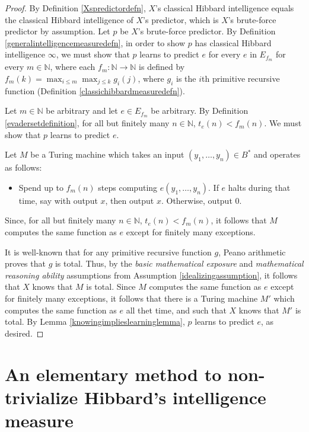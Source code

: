 \documentclass{article}
\begin{document}
\begin{proof}
    By Definition \ref{Xspredictordefn}, $X$'s classical Hibbard intelligence
    equals the classical Hibbard intelligence of $X$'s predictor, which is
    $X$'s brute-force predictor by assumption. Let $p$ be $X$'s brute-force
    predictor. By Definition \ref{generalintelligencemeasuredefn}, in order
    to show $p$ has classical Hibbard intelligence $\infty$, we must
    show that $p$ learns to predict $e$ for every $e$ in $E_{f_m}$ for
    every $m\in\mathbb N$,
    where each $f_m:\mathbb N\to\mathbb N$ is defined by
    $f_m(k)=\max_{i\leq m}\max_{j\leq k}g_i(j)$,
    where $g_i$ is the $i$th primitive recursive function
    (Definition \ref{classichibbardmeasuredefn}).

    Let $m\in\mathbb N$ be arbitrary and let $e\in E_{f_m}$ be arbitrary.
    By Definition \ref{evadersetdefinition},
    for all but finitely many $n\in\mathbb N$, $t_e(n)<f_m(n)$.
    We must show that $p$ learns to predict $e$.

    Let $M$ be a Turing machine which takes an input
    $(y_1,\ldots,y_n)\in B^*$ and
    operates as follows:
    \begin{itemize}
        \item
        Spend up to $f_m(n)$ steps computing $e(y_1,\ldots,y_n)$.
        If $e$ halts during that time, say with output $x$, then output $x$.
        Otherwise, output $0$.
    \end{itemize}
    Since, for all but finitely many $n\in\mathbb N$, $t_e(n)<f_m(n)$,
    it follows that $M$ computes the same function as $e$ except for finitely
    many exceptions.

    It is well-known that for any primitive recursive function $g$, Peano
    arithmetic proves that $g$ is total. Thus, by the \emph{basic mathematical
    exposure} and \emph{mathematical reasoning ability} assumptions from
    Assumption \ref{idealizingassumption}, it follows that $X$ knows that
    $M$ is total. Since $M$ computes the same function as $e$ except for
    finitely many exceptions, it follows that there is a Turing machine $M'$
    which computes the same function as $e$ all thet time, and such that $X$
    knows that $M'$ is total. By Lemma \ref{knowingimplieslearninglemma},
    $p$ learns to predict $e$, as desired.
\end{proof}

\section{An elementary method to non-trivialize Hibbard's intelligence measure}
\label{simplemeasuresection}
\end{document}
